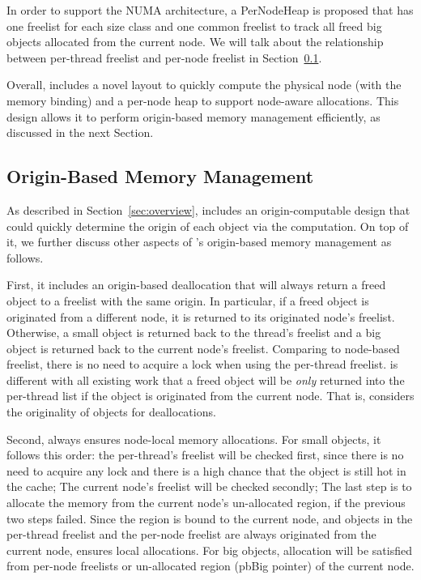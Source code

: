 In order to support the NUMA architecture, a PerNodeHeap is proposed that has one freelist for each size class and one common freelist to track all freed big objects allocated from the current node. We will talk about the relationship between per-thread freelist and per-node freelist in Section~\ref{sec:origin}. 

Overall, \NM{} includes a novel layout to quickly compute the physical node (with the memory binding) and a per-node heap to support node-aware allocations. This design allows it to perform origin-based memory management efficiently, as discussed in the next Section. 

\subsection{Origin-Based Memory Management} 
\label{sec:origin}

As described in Section~\ref{sec:overview}, \NM{} includes an origin-computable design that could quickly determine the origin of each object via the computation. On top of it, we further discuss other aspects of \NM{}'s origin-based memory management as follows.  

First, it includes an origin-based deallocation that will always return a freed object to a freelist with the same origin. In particular, if a freed object is originated from a different node, it is returned to its originated node's freelist. Otherwise, a small object is returned back to the thread's freelist and a big object is returned back to the current node's freelist. Comparing to node-based freelist, there is no need to acquire a lock when using the per-thread freelist. \NM{} is  different with all existing work that a freed object will be \textit{only} returned into the per-thread list if the object is originated from the current node. That is, \NM{} considers the originality of objects for deallocations.   

Second, \NM{} always ensures node-local memory allocations. For small objects, it follows this order: the per-thread's freelist will be checked first, since there is no need to acquire any lock and there is a high chance that the object is still hot in the cache; The current node's freelist will be checked secondly; The last step is to allocate the memory from the current node's un-allocated region, if the previous two steps failed. Since the region is bound to the current node, and objects in the per-thread freelist and the per-node freelist are always originated from the current node, \NM{} ensures local allocations. For big objects, allocation will be satisfied from    per-node freelists or un-allocated region (pbBig pointer) of the current node. 

